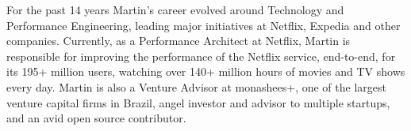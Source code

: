 For the past 14 years Martin's career evolved around Technology and Performance Engineering, leading major initiatives at Netflix, Expedia and other companies. Currently, as a Performance Architect at Netflix, Martin is responsible for improving the performance of the Netflix service, end-to-end, for its 195+ million users, watching over 140+ million hours of movies and TV shows every day. Martin is also a Venture Advisor at monashees+, one of the largest venture capital firms in Brazil, angel investor and advisor to multiple startups, and an avid open source contributor.